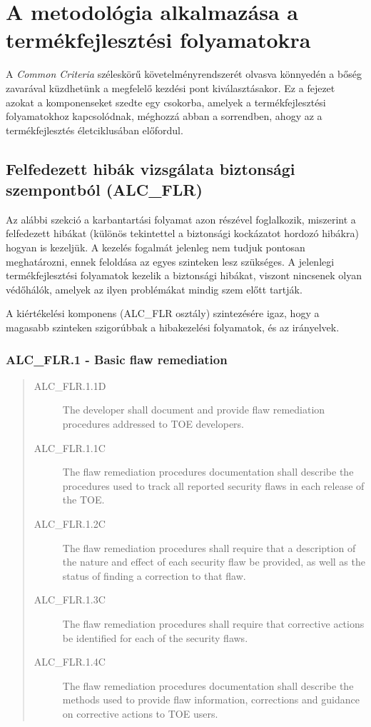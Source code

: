 \chapter{A metodológia alkalmazása a termékfejlesztési folyamatokra}

A \emph{Common Criteria} széleskörű követelményrendszerét olvasva könnyedén a bőség zavarával
küzdhetünk a megfelelő kezdési pont kiválasztásakor. Ez a fejezet azokat a komponenseket szedte egy
csokorba, amelyek a termékfejlesztési folyamatokhoz kapcsolódnak, méghozzá abban a sorrendben, ahogy
az a termékfejlesztés életciklusában előfordul.

\section{Felfedezett hibák vizsgálata biztonsági szempontból (ALC\_FLR)}

Az alábbi szekció a karbantartási folyamat azon részével foglalkozik, miszerint a felfedezett
hibákat (különös tekintettel a biztonsági kockázatot hordozó hibákra) hogyan is kezeljük. A kezelés
fogalmát jelenleg nem tudjuk pontosan meghatározni, ennek feloldása az egyes szinteken lesz
szükséges. A jelenlegi termékfejlesztési folyamatok kezelik a biztonsági hibákat, viszont nincsenek
olyan védőhálók, amelyek az ilyen problémákat mindig szem előtt tartják.

A kiértékelési komponens (ALC\_FLR osztály) szintezésére igaz, hogy a magasabb szinteken
szigorúbbak a hibakezelési folyamatok, és az irányelvek.

\subsection{ALC\_FLR.1 - Basic flaw remediation}
\begin{quote}
    \begin{description}
        \item[ALC\_FLR.1.1D]{The developer shall document and provide flaw remediation procedures
            addressed to TOE developers.}
        \item[ALC\_FLR.1.1C]{The flaw remediation procedures documentation shall describe the
            procedures used to track all reported security flaws in each release of the TOE.}
        \item[ALC\_FLR.1.2C]{The flaw remediation procedures shall require that a description of the
            nature and effect of each security flaw be provided, as well as the status of finding
            a correction to that flaw.}
        \item[ALC\_FLR.1.3C]{The flaw remediation procedures shall require that corrective actions
            be identified for each of the security flaws.}
        \item[ALC\_FLR.1.4C]{The flaw remediation procedures documentation shall describe the
            methods used to provide flaw information, corrections and guidance on corrective actions
            to TOE users.}
    \end{description}
\end{quote}

